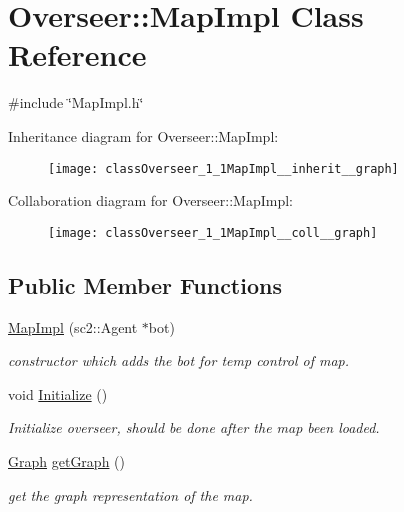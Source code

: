 \hypertarget{classOverseer_1_1MapImpl}{}\section{Overseer\+:\+:Map\+Impl Class Reference}
\label{classOverseer_1_1MapImpl}


{\ttfamily \#include \char`\"{}Map\+Impl.\+h\char`\"{}}



Inheritance diagram for Overseer\+:\+:Map\+Impl\+:
\nopagebreak
\begin{figure}[H]
\begin{center}
\leavevmode
\texttt{[image: classOverseer\_1\_1MapImpl\_\_inherit\_\_graph]}
\end{center}
\end{figure}


Collaboration diagram for Overseer\+:\+:Map\+Impl\+:
\nopagebreak
\begin{figure}[H]
\begin{center}
\leavevmode
\texttt{[image: classOverseer\_1\_1MapImpl\_\_coll\_\_graph]}
\end{center}
\end{figure}
\subsection*{Public Member Functions}
\begin{DoxyCompactItemize}
\item 
\hyperlink{classOverseer_1_1MapImpl_a9c30887c6f342971fabd54d23b36a765}{Map\+Impl} (sc2\+::\+Agent $\ast$bot)
\begin{DoxyCompactList}\small\item\em constructor which adds the bot for temp control of map. \end{DoxyCompactList}\item 
void \hyperlink{classOverseer_1_1MapImpl_a5ec5b37d1ae07732a99845bfbbfce016}{Initialize} ()\hypertarget{classOverseer_1_1MapImpl_a5ec5b37d1ae07732a99845bfbbfce016}{}\label{classOverseer_1_1MapImpl_a5ec5b37d1ae07732a99845bfbbfce016}

\begin{DoxyCompactList}\small\item\em Initialize overseer, should be done after the map been loaded. \end{DoxyCompactList}\item 
\hyperlink{classOverseer_1_1Graph}{Graph} \hyperlink{classOverseer_1_1MapImpl_abedbb01faa88ff9bd3f8cd2dbec0dead}{get\+Graph} ()\hypertarget{classOverseer_1_1MapImpl_abedbb01faa88ff9bd3f8cd2dbec0dead}{}\label{classOverseer_1_1MapImpl_abedbb01faa88ff9bd3f8cd2dbec0dead}

\begin{DoxyCompactList}\small\item\em get the graph representation of the map. \end{DoxyCompactList}\end{DoxyCompactItemize}
